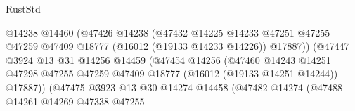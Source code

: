 \begin{lexlean}{RustStd}
\begin{coremodule}
                                              @14238
                                              @14460
                                              (@47426
                                                @14238
                                                (@47432
                                                  @14225
                                                  @14233
                                                  @47251
                                                  @47255
                                                  @47259
                                                  @47409
                                                  @18777
                                                  (@16012 (@19133 @14233 @14226))
                                                  @17887))
                                              (@47447
                                                @3924
                                                @13
                                                @31
                                                @14256
                                                @14459
                                                (@47454
                                                  @14256
                                                  (@47460
                                                    @14243
                                                    @14251
                                                    @47298
                                                    @47255
                                                    @47259
                                                    @47409
                                                    @18777
                                                    (@16012 (@19133 @14251 @14244))
                                                    @17887))
                                                (@47475
                                                  @3923
                                                  @13
                                                  @30
                                                  @14274
                                                  @14458
                                                  (@47482
                                                    @14274
                                                    (@47488
                                                      @14261
                                                      @14269
                                                      @47338
                                                      @47255

\end{coremodule}
\end{lexlean}
